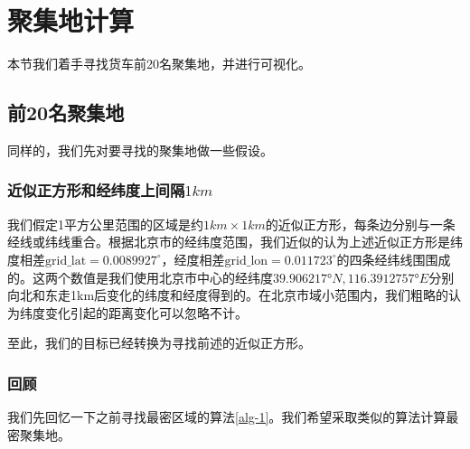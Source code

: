 \documentclass[UTF8]{ctexart}
\begin{document}
\begin{table}[ht]
\begin{center}
    \end{center}
    \end{table}

\section{聚集地计算}

本节我们着手寻找货车前20名聚集地，并进行可视化。

\subsection{前20名聚集地}

同样的，我们先对要寻找的聚集地做一些假设。

\subsubsection{近似正方形和经纬度上间隔$1km$}

我们假定1平方公里范围的区域是约$1km\times 1km$的近似正方形，每条边分别与一条经线或纬线重合。根据北京市的经纬度范围，我们近似的认为上述近似正方形是纬度相差$\text{grid\_lat} = 0.0089927^\circ$，经度相差$\text{grid\_lon} = 0.011723^\circ$的四条经纬线围围成的。这两个数值是我们使用北京市中心的经纬度$39.906217°N, 116.3912757°E$分别向北和东走1km后变化的纬度和经度得到的。在北京市域小范围内，我们粗略的认为纬度变化引起的距离变化可以忽略不计。

至此，我们的目标已经转换为寻找前述的近似正方形。

\subsubsection{回顾}

我们先回忆一下之前寻找最密区域的算法\ref{alg-1}。我们希望采取类似的算法计算最密聚集地。
\end{document}
